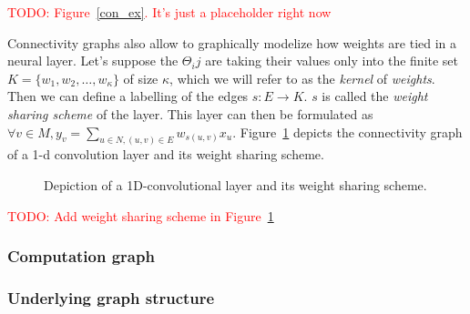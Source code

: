 \documentclass{article}
\theoremstyle{definition}
\theoremstyle{remark}
\theoremstyle{plain}
\newcommand{\todo}[1]{\textcolor{red}{TODO: #1\\}}
\begin{document}
\todo{Figure~\ref{con_ex}. It's just a placeholder right now}


Connectivity graphs also allow to graphically modelize how weights are tied in a neural layer. Let's suppose the $\Theta_ij$ are taking their values only into the finite set $K = \{w_1, w_2, \ldots, w_\kappa\}$ of size $\kappa$, which we will refer to as the \emph{kernel} of \emph{weights}. Then we can define a labelling of the edges $s: E \rightarrow K$. $s$ is called the \emph{weight sharing scheme} of the layer. This layer can then be formulated as $\displaystyle \forall v \in M, y_v = \sum_{u \in N, (u,v) \in E} w_{s(u,v)} x_u$. Figure~\ref{cnn} depicts the connectivity graph of a 1-d convolution layer and its weight sharing scheme.

\begin{figure}[h]
  \begin{center}
  \end{center}
  \caption{Depiction of a 1D-convolutional layer and its weight sharing scheme.}
  \label{cnn}
\end{figure}


\todo{Add weight sharing scheme in Figure~\ref{cnn}}

\subsubsection{Computation graph}
\label{comp_graph}

\subsubsection{Underlying graph structure}
\label{inductive_graph}
\end{document}
